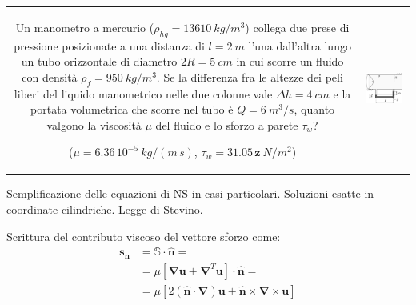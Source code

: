 \noindent
\begin{tabular}{cc}
\begin{minipage}[b]{0.60\textwidth}
\begin{exerciseS}
Un manometro a mercurio ($\rho_{hg} = 13610 \  kg/m^3$)
collega due prese di pressione posizionate a una distanza di $l = 2 \ 
m$ l'una dall'altra lungo un tubo orizzontale di diametro $2R = 5 \ cm$
 in cui scorre un fluido con densità $\rho_{f} = 950 \
kg/m^3$. Se la differenza fra le altezze dei peli liberi del 
liquido manometrico nelle due colonne
vale $\Delta h = 4 \ cm$ e la portata volumetrica che scorre nel tubo è 
$Q= 6\ m^3/s$,
quanto valgono la viscosità $\mu$ del fluido e lo sforzo a parete
$\tau_w$?

($\mu = 6.36\,10^{-5} \ kg/(m\, s)$,
$\tau_w = 31.05\, \bm{z}\ N/m^2$)
\end{exerciseS}
\end{minipage}
&
\begin{minipage}[b]{0.35\textwidth}
   \begin{center}
   \includegraphics[width=0.90\textwidth]{./fig/slnEsatte-poiseuille}
   \end{center}
\end{minipage}
\end{tabular}


\sol

\partone Semplificazione delle equazioni di NS in casi particolari. 
Soluzioni esatte in coordinate cilindriche. Legge di Stevino.

Scrittura del contributo viscoso del vettore sforzo come:
\begin{equation}
\begin{aligned}
  \bm{s_n} & = \mathbb{S} \cdot \bm{\hat{n}} = \\
           & = \mu [\bm{\nabla} \bm{u} + \bm{\nabla}^T \bm{u}] \cdot \bm{\hat{n}} = \\
           & = \mu \left[ 2 (\bm{\hat{n}} \cdot \bm{\nabla} ) \bm{u} + \bm{\hat{n}} \times \bm{\nabla} \times \bm{u}  \right]
\end{aligned}
\end{equation}

